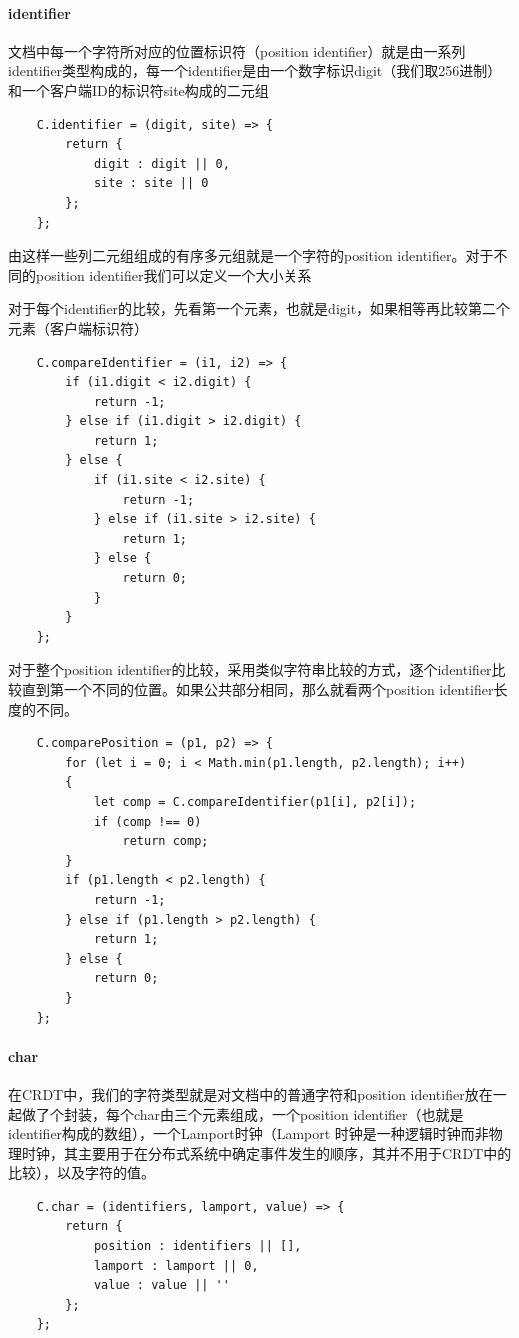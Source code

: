 \documentclass[11pt]{ctexart}
\begin{document}
\paragraph{\textsf{identifier}}
文档中每一个字符所对应的位置标识符（position identifier）就是由一系列identifier类型构成的，每一个identifier是由一个数字标识digit（我们取256进制）和一个客户端ID的标识符site构成的二元组
\begin{verbatim}
    C.identifier = (digit, site) => {
        return {
            digit : digit || 0,
            site : site || 0
        };
    };
\end{verbatim}

由这样一些列二元组组成的有序多元组就是一个字符的position identifier。对于不同的position identifier我们可以定义一个大小关系

对于每个identifier的比较，先看第一个元素，也就是digit，如果相等再比较第二个元素（客户端标识符）
\begin{verbatim}
    C.compareIdentifier = (i1, i2) => {
        if (i1.digit < i2.digit) {
            return -1;
        } else if (i1.digit > i2.digit) {
            return 1;
        } else {
            if (i1.site < i2.site) {
                return -1;
            } else if (i1.site > i2.site) {
                return 1;
            } else {
                return 0;
            }
        }
    };
\end{verbatim}

对于整个position identifier的比较，采用类似字符串比较的方式，逐个identifier比较直到第一个不同的位置。如果公共部分相同，那么就看两个position identifier长度的不同。
\begin{verbatim}
    C.comparePosition = (p1, p2) => {
        for (let i = 0; i < Math.min(p1.length, p2.length); i++)
        {
            let comp = C.compareIdentifier(p1[i], p2[i]);
            if (comp !== 0)
                return comp;
        }
        if (p1.length < p2.length) {
            return -1;
        } else if (p1.length > p2.length) {
            return 1;
        } else {
            return 0;
        }
    };
\end{verbatim}

\paragraph{\textsf{char}} 在CRDT中，我们的字符类型就是对文档中的普通字符和position identifier放在一起做了个封装，每个char由三个元素组成，一个position identifier（也就是identifier构成的数组），一个Lamport时钟（Lamport
时钟是一种逻辑时钟而非物理时钟，其主要用于在分布式系统中确定事件发生的顺序，其并不用于CRDT中的比较），以及字符的值。
\begin{verbatim}
    C.char = (identifiers, lamport, value) => {
        return {
            position : identifiers || [],
            lamport : lamport || 0,
            value : value || ''
        };
    };
\end{verbatim}
\end{document}
